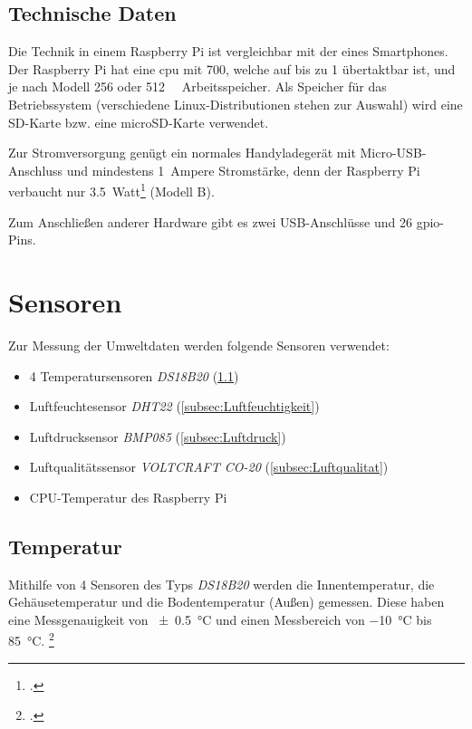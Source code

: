 \subsection{Technische Daten}
\label{subsec:Technische Daten}
Die Technik in einem Raspberry Pi ist vergleichbar mit der eines Smartphones. Der Raspberry Pi hat eine \acrshort{cpu} mit \SI{700}{}, welche auf bis zu \SI{1}{} übertaktbar ist, und je nach Modell \SI{256}{} oder \SI{512}{\mega\byte} Arbeitsspeicher. Als Speicher für das Betriebssystem (verschiedene Linux-Distributionen stehen zur Auswahl) wird eine SD-Karte bzw. eine microSD-Karte verwendet.

Zur Stromversorgung genügt ein normales Handyladegerät mit Micro-USB-Anschluss und mindestens \SI{1}{\gls{Ampere}} Stromstärke, denn der Raspberry Pi verbaucht nur \SI{3.5}{Watt}\footcite{strom} (Modell B).

Zum Anschließen anderer Hardware gibt es zwei USB-Anschlüsse und 26 \gls{gpio}-Pins.

\section{Sensoren}
\label{sec:Sensoren}

Zur Messung der Umweltdaten werden folgende Sensoren verwendet:
\begin{itemize}
\item 4 Temperatursensoren \emph{DS18B20} (\ref{subsec:Temperatur})
\item Luftfeuchtesensor \emph{DHT22} (\ref{subsec:Luftfeuchtigkeit})
\item Luftdrucksensor \emph{BMP085} (\ref{subsec:Luftdruck})
\item Luftqualitätssensor \emph{VOLTCRAFT CO-20} (\ref{subsec:Luftqualitat})
\item CPU-Temperatur des Raspberry Pi
\end{itemize}
\subsection{Temperatur}
\label{subsec:Temperatur}

Mithilfe von 4 Sensoren des Typs \emph{DS18B20} werden die Innentemperatur, die Gehäusetemperatur und die Bodentemperatur (Außen) gemessen. Diese haben eine Messgenauigkeit von \SI{\pm 0.5}{\degreeCelsius}  und einen Messbereich von \SI{-10}{\degreeCelsius}  bis \SI{+85}{\degreeCelsius}. \footcite[20]{temp}

